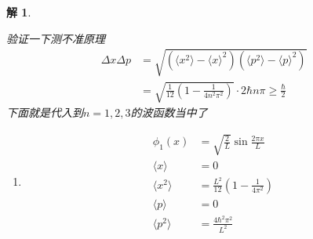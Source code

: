 \documentclass{article}
\newtheorem{solution}{解}
\newcommand{\expectation}[1]{\langle #1 \rangle}
\begin{document}
\begin{solution}
\begin{enumerate}
    验证一下测不准原理
    \begin{align*}
        \Delta x\Delta p&=\sqrt{\left(\expectation{x^2}-\expectation{x}^2\right)\left(\expectation{p^2}-\expectation{p}^2\right)}\\
        &=\sqrt{\frac{1}{12}\left(1-\frac{1}{4n^2\pi^2}\right)}\cdot 2\hbar n\pi\geqslant\frac{\hbar}{2}
    \end{align*}
    下面就是代入到$n=1,2,3$的波函数当中了
    \begin{enumerate}
        \item[n=1] 
        \begin{align*}
            \phi_1(x)&=\sqrt{\frac{2}{L}}\sin{\frac{2\pi x}{L}}\\
            \expectation{x}&=0\\
            \expectation{x^2}&=\frac{L^2}{12}\left(1-\frac{1}{4\pi^2}\right)\\
            \expectation{p}&=0\\
            \expectation{p^2}&=\frac{4\hbar^2\pi^2}{L^2}
        \end{align*}
        

\end{enumerate}
\end{enumerate}
\end{solution}
\end{document}
